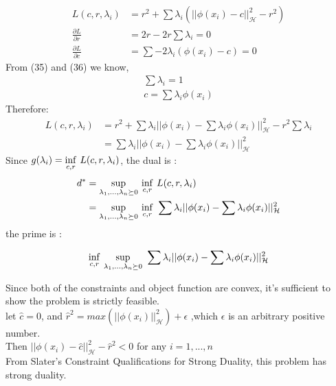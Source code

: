 \documentclass{article}
\newenvironment{sub}[2][$-$]{\begin{trivlist}
		\item[\hskip \labelsep {\bfseries #1}\hskip \labelsep {\bfseries #2.}]}  {\end{trivlist}}
\begin{document}
\begin{sub}{9.2}
\end{sub}
\begin{align}
L(c,r,\lambda_i) &= r^2 + \sum \lambda_i(||\phi(x_i) - c||_{\mathcal{H}}^2 - r^2)\\
\frac{\partial L}{\partial r} &= 2r -2r \sum \lambda_i= 0 \\
\frac{\partial L}{\partial c} &= \sum -2 \lambda_i (\phi(x_i) - c) = 0 
\end{align}
From (35) and (36) we know, \begin{align}
\sum \lambda_i = 1\\
c = \sum \lambda_i\phi(x_i)
\end{align}
Therefore:
\begin{align}
L(c,r,\lambda_i) &= r^2 +\sum  \lambda_i||\phi(x_i) - \sum \lambda_i\phi(x_i)||_{\mathcal{H}}^2  -r^2\sum \lambda_i\\& = \sum  \lambda_i||\phi(x_i) - \sum \lambda_i\phi(x_i)||_{\mathcal{H}}^2 
\end{align}
Since $g(\lambda_i) = \underset{c,r}{\operatorname{inf}} \hspace{0.05in} L(c,r,\lambda_i)$, the dual is :
\begin{align}
d^* &=  \underset{\lambda_1,...,\lambda_n \succeq 0}{\operatorname{sup}} \hspace{0.05in} \underset{c,r}{\operatorname{inf}} \hspace{0.05in} L(c,r,\lambda_i)\\
&=  \underset{\lambda_1,...,\lambda_n \succeq 0}{\operatorname{sup}} \hspace{0.05in} \underset{c,r}{\operatorname{inf}} \hspace{0.05in} \sum  \lambda_i||\phi(x_i) - \sum \lambda_i\phi(x_i)||_{\mathcal{H}}^2 
\end{align}
the prime is :

\begin{align}
 \underset{c,r}{\operatorname{inf}} \hspace{0.05in}\underset{\lambda_1,...,\lambda_n \succeq 0}{\operatorname{sup}} \hspace{0.05in} \sum  \lambda_i||\phi(x_i) - \sum \lambda_i\phi(x_i)||_{\mathcal{H}}^2 
\end{align}

\begin{sub}{9.3}
\end{sub}
Since both of the constraints and object function are convex, it's sufficient to show the problem is strictly feasible.\\
let $\hat{c} = 0$, and $\hat{r}^2 = max(||\phi(x_i)||^2_\mathcal{H}) + \epsilon$ ,which $\epsilon$ is an arbitrary positive number. \\
Then $||\phi(x_i) - \hat{c}||^2_\mathcal{H} - \hat{r}^2<0$  for any $i = 1,..., n$\\
From Slater’s Constraint Qualifications for Strong Duality, this problem has strong duality.
\end{document}
